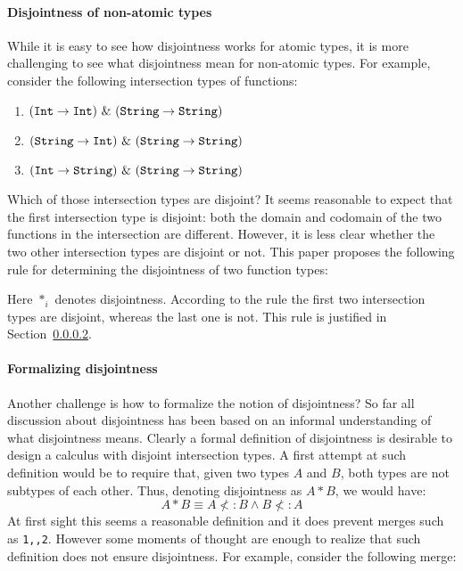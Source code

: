 \paragraph{Disjointness of non-atomic types} 
While it is easy to see how disjointness works for atomic types, 
it is more challenging to see what disjointness mean for non-atomic types.
For example, consider the following intersection types of functions:

\begin{enumerate}

\item $(\code{Int} \to \code{Int})~\inter~(\code{String} \to \code{String})$
\item $(\code{String} \to \code{Int})~\inter~(\code{String} \to \code{String})$
\item $(\code{Int} \to \code{String})~\inter~(\code{String} \to \code{String})$

\end{enumerate}

\noindent Which of those intersection types are disjoint? 
It seems reasonable to expect that the first intersection type is
disjoint: both the domain and codomain of the two functions in the
intersection are different. However, it is less clear whether the two
other intersection types are disjoint or not. This paper proposes the 
following rule for determining the disjointness of two function types:

\begin{mathpar}
\end{mathpar}

\noindent Here $*_i$ denotes disjointness. According to the rule the first 
two intersection types are disjoint, whereas the last one is not. This 
rule is justified in Section~\ref{}. 

\paragraph{Formalizing disjointness} Another challenge is how to formalize 
the notion of disjointness? So far all discussion about disjointness has been 
based on an informal understanding of what disjointness means. Clearly a formal 
definition of disjointness is desirable to design a calculus with disjoint 
intersection types. A first attempt at such definition would
be to require that, given two types $A$ and $B$, both types are not
subtypes of each other. Thus, denoting disjointness as $A * B$, we would have:
\[A * B \equiv A \not<: B \wedge B \not<: A\]
At first sight this seems a reasonable definition and it does prevent
merges such as \lstinline{1,,2}. However some moments of thought are enough to realize that
such definition does not ensure disjointness. For example, consider
the following merge:

